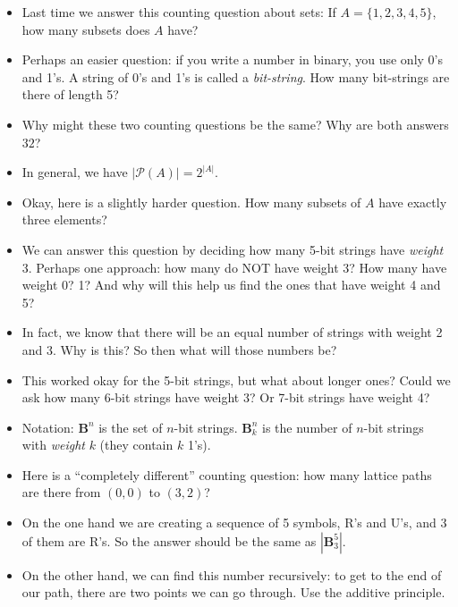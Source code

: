 \documentclass[12pt]{article}
\theoremstyle{plain}
\theoremstyle{definition}
\theoremstyle{remark}
\def\pow{\mathcal{P}}
\def\b{\mathbf}
\begin{document}
 \begin{itemize}

	\item Last time we answer this counting question about sets: If $A = \{1,2,3,4,5\}$, how many subsets does $A$ have?

	\item Perhaps an easier question: if you write a number in binary, you use only 0's and 1's.  A string of 0's and 1's is called a \emph{bit-string}.  How many bit-strings are there of length 5?

	\item Why might these two counting questions be the same?  Why are both answers $32$?

	\item In general, we have $|\pow(A)| = 2^{|A|}$.

	\item Okay, here is a slightly harder question.  How many subsets of $A$ have exactly three elements?

	\item We can answer this question by deciding how many 5-bit strings have \emph{weight} 3.  Perhaps one approach: how many do NOT have weight 3?  How many have weight 0?  1?  And why will this help us find the ones that have weight 4 and 5?

	\item In fact, we know that there will be an equal number of strings with weight 2 and 3.  Why is this?  So then what will those numbers be?

	\item This worked okay for the 5-bit strings, but what about longer ones?  Could we ask how many 6-bit strings have weight 3?  Or 7-bit strings have weight 4?

   \item Notation: $\b B^n$ is the set of $n$-bit strings.  $\b B^n_k$ is the number of $n$-bit strings with {\em weight} $k$ (they contain $k$ 1's).

   \item Here is a ``completely different'' counting question: how many lattice paths are there from $(0,0)$ to $(3,2)$?

   \item On the one hand we are creating a sequence of 5 symbols, R's and U's, and 3 of them are R's.  So the answer should be the same as $|\b B^5_3|$.

   \item On the other hand, we can find this number recursively: to get to the end of our path, there are two points we can go through.  Use the additive principle.



\end{itemize}
\end{document}
